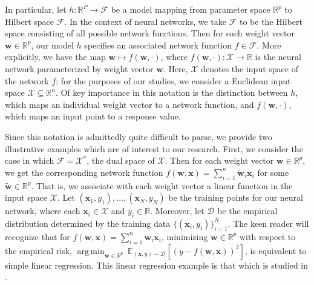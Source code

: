\documentclass{article}
\DeclareMathOperator*{\argmin}{arg\,min}
\begin{document}
In particular, let $h: \mathbb{R}^P \rightarrow \mathcal{F}$ be a model mapping from parameter space $\mathbb{R}^p$ to Hilbert space $\mathcal{F}$. In the context of neural networks, we take $\mathcal{F}$ to be the Hilbert space consisting of all possible network functions. Then for each weight vector $\boldsymbol{w} \in \mathbb{R}^p$, our model $h$ specifies an associated network function $f \in \mathcal{F}$. More explicitly, we have the map $\boldsymbol{w} \mapsto f(\boldsymbol{w}, \cdot)$, where $f(\boldsymbol{w}, \cdot): \mathcal{X} \rightarrow \mathbb{R}$ is the neural network parameterized by weight vector $\boldsymbol{w}$. Here, $\mathcal{X}$ denotes the input space of the network $f$; for the purposes of our studies, we consider a Euclidean input space $\mathcal{X} \subseteq \mathbb{R}^n$. Of key importance in this notation is the distinction between $h$, which maps an individual weight vector to a network function, and $f(\boldsymbol{w}, \cdot)$, which maps an input point to a response value.

Since this notation is admittedly quite difficult to parse, we provide two illustrative examples which are of interest to our research. First, we consider the case in which $\mathcal{F} = \mathcal{X}^*$, the dual space of $\mathcal{X}$. Then for each weight vector $\boldsymbol{w} \in \mathbb{R}^p$, we get the corresponding network function $f(\boldsymbol{w}, \boldsymbol{x}) = \sum_{i=1}^n \boldsymbol{\tilde{w}}_i\boldsymbol{x}_i$ for some $\boldsymbol{\tilde{w}} \in \mathbb{R}^p$. That is, we associate with each weight vector a linear function in the input space $\mathcal{X}$. Let $(\boldsymbol{x}_1, y_1), \ldots, (\boldsymbol{x}_N, y_N)$ be the training points for our neural network, where each $\boldsymbol{x}_i \in \mathcal{X}$ and $y_i \in \mathbb{R}$. Moreover, let $\mathcal{D}$ be the empirical distribution determined by the training data $\{(\boldsymbol{x}_i, y_i) \}_{i=1}^N$. The keen reader will recognize that for $f(\boldsymbol{w}, \boldsymbol{x}) = \sum_{i=1}^n \boldsymbol{w}_i\boldsymbol{x}_i$, minimizing $\boldsymbol{w} \in \mathbb{R}^p$ with respect to the empirical risk, $\argmin_{\boldsymbol{w} \in \mathbb{R}^p} \  \mathbb{E}_{(\boldsymbol{x}, y) \sim \mathcal{D}}\left[\left(y - f(\boldsymbol{w}, \boldsymbol{x}) \right)^2 \right]$, is equivalent to simple linear regression. This linear regression example is that which is studied in \cite{woodworth2020kernel}. 
\end{document}
